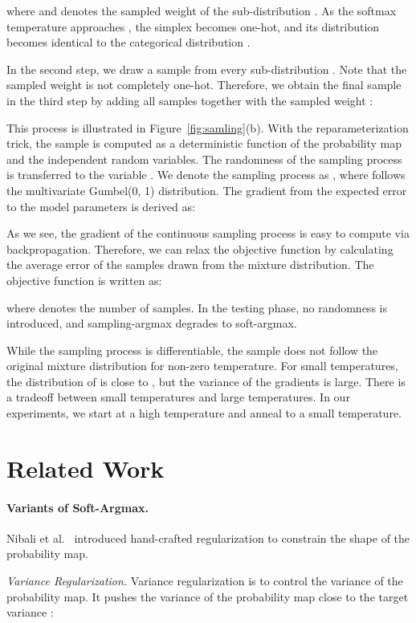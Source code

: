 \documentclass{article}
\begin{document}
where  and  denotes the sampled weight of the sub-distribution . As the softmax temperature  approaches , the simplex  becomes one-hot, and its distribution becomes identical to the categorical distribution .

In the second step, we draw a sample  from every sub-distribution . Note that the sampled weight is not completely one-hot. Therefore, we obtain the final sample  in the third step by adding all samples together with the sampled weight :

This process is illustrated in Figure~\ref{fig:samling}(b). With the reparameterization trick, the sample  is computed as a deterministic function of the probability map  and the independent random variables. The randomness of the sampling process is transferred to the variable . We denote the sampling process as , where  follows the multivariate Gumbel(0, 1) distribution. The gradient from the expected error to the model parameters  is derived as:

As we see, the gradient of the continuous sampling process is easy to compute via backpropagation. Therefore, we can relax the objective function by calculating the average error of the samples drawn from the mixture distribution. The objective function is written as:

where  denotes the number of samples. In the testing phase, no randomness is introduced, and sampling-argmax degrades to soft-argmax.

While the sampling process is differentiable, the sample  does not follow the original mixture distribution  for non-zero temperature. For small temperatures, the distribution of  is close to , but the variance of the gradients is large. There is a tradeoff between small temperatures and large temperatures. In our experiments, we start at a high temperature and anneal to a small temperature.
 
\section{Related Work}

\paragraph{Variants of Soft-Argmax.}
Nibali et al.~\cite{nibali2018numerical} introduced hand-crafted regularization to constrain the shape of the probability map.

\textit{Variance Regularization.} Variance regularization is to control the variance of the probability map. It pushes the variance of the probability map close to the target variance :
\end{document}
